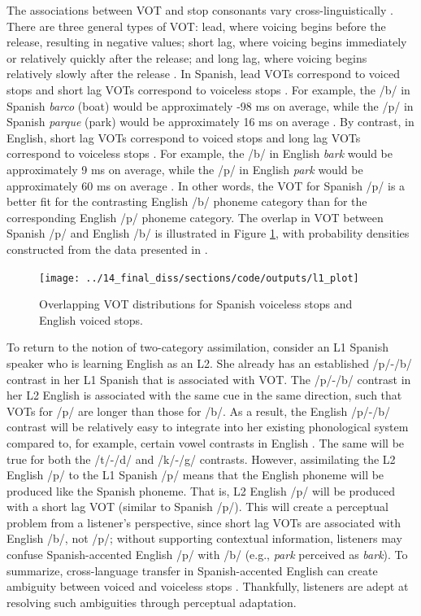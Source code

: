 \documentclass[preprint, 3p, authoryear]{elsarticle} %
\begin{document}
The associations between VOT and stop consonants vary cross-linguistically \citep{chodroff2019, lisker1970}.
There are three general types of VOT: lead, where voicing begins before the release, resulting in negative values; short lag, where voicing begins immediately or relatively quickly after the release; and long lag, where voicing begins relatively slowly after the release \citep{abramson2017}.
In Spanish, lead VOTs correspond to voiced stops and short lag VOTs correspond to voiceless stops \citep{vicente1986, williams1977}.
For example, the /b/ in Spanish \emph{barco} (boat) would be approximately -98 ms on average, while the /p/ in Spanish \emph{parque} (park) would be approximately 16 ms on average \citep[values calculated from][]{chodroff2019}.
By contrast, in English, short lag VOTs correspond to voiced stops and long lag VOTs correspond to voiceless stops \citep{chodroff2017}.
For example, the /b/ in English \emph{bark} would be approximately 9 ms on average, while the /p/ in English \emph{park} would be approximately 60 ms on average \citep[values calculated from][]{chodroff2019}.
In other words, the VOT for Spanish /p/ is a better fit for the contrasting English /b/ phoneme category than for the corresponding English /p/ phoneme category.
The overlap in VOT between Spanish /p/ and English /b/ is illustrated in Figure \ref{fig:intro-fig}, with probability densities constructed from the data presented in \citet{chodroff2019}.

\begin{figure}

{\centering \texttt{[image: ../14\_final\_diss/sections/code/outputs/l1\_plot]} 

}

\caption{Overlapping VOT distributions for Spanish voiceless stops and English voiced stops.}\label{fig:intro-fig}
\end{figure}

To return to the notion of two-category assimilation, consider an L1 Spanish speaker who is learning English as an L2.
She already has an established /p/-/b/ contrast in her L1 Spanish that is associated with VOT.
The /p/-/b/ contrast in her L2 English is associated with the same cue in the same direction, such that VOTs for /p/ are longer than those for /b/.
As a result, the English /p/-/b/ contrast will be relatively easy to integrate into her existing phonological system compared to, for example, certain vowel contrasts in English \citep{baigorri2019}.
The same will be true for both the /t/-/d/ and /k/-/g/ contrasts.
However, assimilating the L2 English /p/ to the L1 Spanish /p/ means that the English phoneme will be produced like the Spanish phoneme.
That is, L2 English /p/ will be produced with a short lag VOT (similar to Spanish /p/).
This will create a perceptual problem from a listener's perspective, since short lag VOTs are associated with English /b/, not /p/; without supporting contextual information, listeners may confuse Spanish-accented English /p/ with /b/ (e.g., \emph{park} perceived as \emph{bark}).
To summarize, cross-language transfer in Spanish-accented English can create ambiguity between voiced and voiceless stops \citep{flege1987}.
Thankfully, listeners are adept at resolving such ambiguities through perceptual adaptation.
\end{document}
